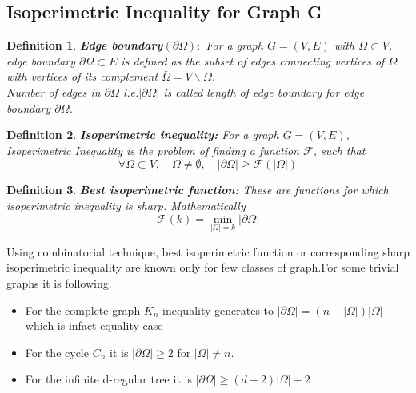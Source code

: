 \documentclass[oneside]{book}
\newtheorem{mydef}{Definition}[section]
\begin{document}
	
	\subsection{Isoperimetric Inequality for Graph G}
	\begin{mydef}{\textbf{Edge boundary\( (\partial \Omega): \)}}
		For a graph \( G = (V,E) \) with \( \Omega \subset V \), edge boundary \( \partial \Omega \subset E \) is defined as the subset of edges connecting vertices of $\Omega$ with vertices of its complement $\bar{\Omega} = V \backslash \Omega $.\\
		 Number of edges in $\partial \Omega $ i.e.$ | \partial \Omega | $ is called length of edge boundary for edge boundary   $\partial \Omega $.
	\end{mydef}
	
	\begin{mydef}{\textbf{Isoperimetric inequality:}}
		For a graph \( G = (V,E) \), Isoperimetric Inequality is the problem of finding a function $\mathcal{F}$, such that
		\begin{equation*}
		\forall \Omega \subset V, \quad \Omega \neq \emptyset, \quad  |\partial \Omega| \geq \mathcal{F}(|\Omega|)
		\end{equation*}
	\end{mydef}
	
	\begin{mydef}{\textbf{Best isoperimetric function:}}
		These are functions for which isoperimetric inequality is sharp. Mathematically
		\begin{equation*}
		\mathcal{F}(k)=\min _{|\Omega|=k}|\partial \Omega|
		\end{equation*}
	\end{mydef}
	Using combinatorial technique, best isoperimetric function or corresponding sharp isoperimetric inequality are known only for few classes of graph.For some trivial graphs it is following.
	
	\begin{itemize}
		\item For the complete graph $K_{n}$ inequality generates to $|\partial \Omega|=(n-|\Omega|) | \Omega|$ 
		which is infact equality case
		\item For the cycle $C_{n}$ it is  $|\partial \Omega|\geq 2$ for $|\Omega| \neq n$.
		\item For the infinite d-regular tree it is $|\partial \Omega| \geq(d-2)| \Omega|+2$\par
	\end{itemize}
	
\end{document}
